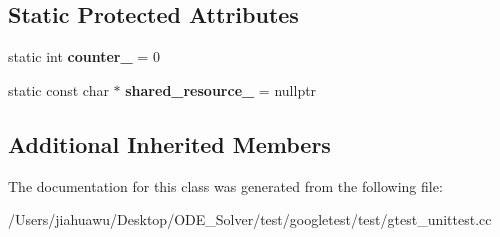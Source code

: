 \subsection*{Static Protected Attributes}
\begin{DoxyCompactItemize}
\item 
\mbox{\label{classtesting_1_1_set_up_test_case_test_a5b6e811128d35389be49f6569bf93817}} 
static int {\bfseries counter\+\_\+} = 0
\item 
\mbox{\label{classtesting_1_1_set_up_test_case_test_a904e77fd9a628b6a9aca0280665fd040}} 
static const char $\ast$ {\bfseries shared\+\_\+resource\+\_\+} = nullptr
\end{DoxyCompactItemize}
\subsection*{Additional Inherited Members}


The documentation for this class was generated from the following file\+:\begin{DoxyCompactItemize}
\item 
/\+Users/jiahuawu/\+Desktop/\+O\+D\+E\+\_\+\+Solver/test/googletest/test/gtest\+\_\+unittest.\+cc\end{DoxyCompactItemize}

